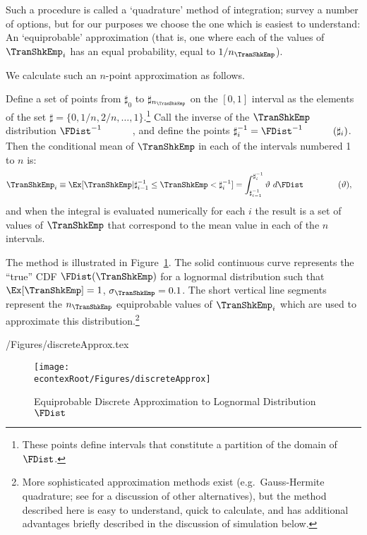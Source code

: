 \documentclass[\econtexRoot/SolvingMicroDSOPs]{subfiles}
\begin{document}
Such a procedure is called a `quadrature' method of integration; \cite{Tanaka2013-bc} survey a number of options, but for our purposes we choose the one which is easiest to understand: An `equiprobable' approximation (that is, one where each of the values of $\TranShkEmp_{i}$ has an equal probability, equal to $1/n_{\TranShkEmp}$).

We calculate such an $n$-point approximation as follows.

Define a set of points from $\sharp_{0}$ to $\sharp_{n_{\TranShkEmp}}$ on the $[0,1]$ interval
as the elements of the set $\sharp = \{0,1/n,2/n, \ldots,1\}$.\footnote{These points define intervals that constitute a partition of the domain of $\FDist$.}  Call the inverse of the $\TranShkEmp$ distribution $\FDist^{-1}_{\phantom{\TranShkEmp}}$, and define the
points $\sharp^{-1}_{i} = \FDist^{-1}_{\phantom{\TranShkEmp}}(\sharp_{i})$.  Then
the conditional mean of $\TranShkEmp$ in each of the intervals numbered 1 to $n$ is:
\begin{equation}\begin{gathered}\begin{aligned}
      \TranShkEmp_{i} \equiv \Ex[\TranShkEmp | \sharp_{i-1}^{-1} \leq \TranShkEmp < \sharp_{i}^{-1}]  & = \int_{\sharp^{-1}_{i-1}}^{\sharp^{-1}_{i}} \vartheta ~ d\FDist_{\phantom{\TranShkEmp}}(\vartheta)  ,
    \end{aligned}\end{gathered}\end{equation}
and when the integral is evaluated numerically for each $i$ the result is a set of values of $\TranShkEmp$ that correspond to the mean value in each of the $n$ intervals.

The method is illustrated in Figure~\ref{fig:discreteapprox}.  The solid continuous curve represents
the ``true'' CDF $\FDist(\TranShkEmp)$ for a lognormal distribution such that $\Ex[\TranShkEmp] = 1$, $\sigma_{\TranShkEmp} = 0.1$.  The short vertical line segments represent the $n_{\TranShkEmp}$
equiprobable values of $\TranShkEmp_{i}$ which are used to approximate this
distribution.\footnote{More sophisticated approximation methods exist
  (e.g.\ Gauss-Hermite quadrature; see \cite{kopecky2010finite} for a discussion of other alternatives), but the method described here is easy to understand, quick to calculate, and has additional advantages briefly described in the discussion of simulation below.}
\begin{verbatimwrite}{\econtexRoot/Figures/discreteApprox.tex}
  \hypertarget{discreteApprox}{}
  \begin{figure}
    \texttt{[image: \\econtexRoot/Figures/discreteApprox]}
    \caption{Equiprobable Discrete Approximation to Lognormal Distribution $\FDist$}
    \label{fig:discreteapprox}
  \end{figure}
\end{verbatimwrite}
\unskip
\end{document}
